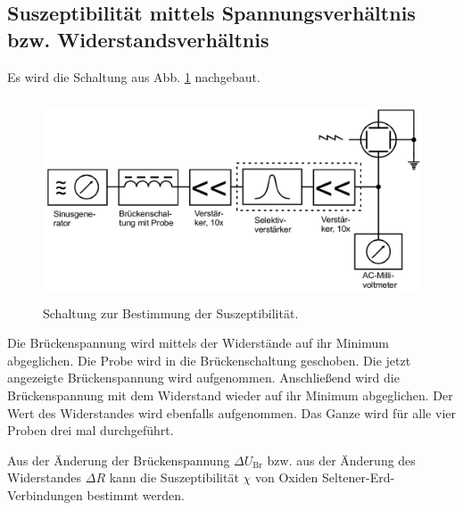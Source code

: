 \subsection{Suszeptibilität mittels Spannungsverhältnis bzw. Widerstandsverhältnis}
Es wird die Schaltung aus Abb. \ref{abb:schaltbild} nachgebaut.

\begin{figure}
    \centering
    \includegraphics[width=12cm, height=6cm]{build/schaltbild.png}
    \caption{Schaltung zur Bestimmung der Suszeptibilität. \cite{V606}}
    \label{abb:schaltbild}
\end{figure}

\noindent Die Brückenspannung wird mittels der Widerstände auf ihr Minimum abgeglichen.
Die Probe wird in die Brückenschaltung geschoben. Die jetzt angezeigte Brückenspannung
wird aufgenommen. Anschließend wird die Brückenspannung mit dem Widerstand wieder auf
ihr Minimum abgeglichen. Der Wert des Widerstandes wird ebenfalls aufgenommen.
Das Ganze wird für alle vier Proben drei mal durchgeführt.

\noindent Aus der Änderung der Brückenspannung $\Delta U_\text{Br}$ bzw. aus der 
Änderung des Widerstandes $\Delta R$ kann die Suszeptibilität $\chi$ von Oxiden 
Seltener-Erd-Verbindungen bestimmt werden.